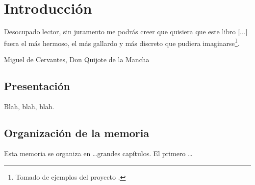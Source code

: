 
\chapter{Introducción}
\label{cha:introduction}

\begin{FraseCelebre}
  \begin{Frase}
    Desocupado lector, sin juramento me podrás creer que quisiera que este
    libro [...] fuera el más hermoso, el más gallardo y más discreto que
    pudiera imaginarse\footnote{Tomado de ejemplos del proyecto \texis{}.}.
  \end{Frase}
  \begin{Fuente}
    Miguel de Cervantes, Don Quijote de la Mancha
  \end{Fuente}
\end{FraseCelebre}


\section{Presentación}
\label{sec:intro-presentacion}

Blah, blah, blah.


\section{Organización de la memoria}
\label{sec:intro-organizacion-memoria}

Esta memoria se organiza en \ldots grandes capítulos. El primero \ldots


